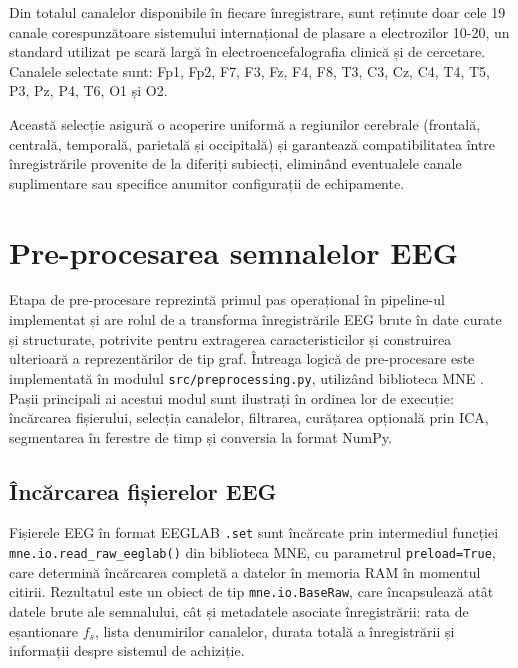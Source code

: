 \documentclass[12pt,a4paper]{report}
\theoremstyle{definition}
\theoremstyle{remark}
\begin{document}
Din totalul canalelor disponibile în fiecare înregistrare, sunt reținute doar cele 19 canale corespunzătoare sistemului internațional de plasare a electrozilor 10-20, un standard utilizat pe scară largă în electroencefalografia clinică și de cercetare. Canalele selectate sunt: Fp1, Fp2, F7, F3, Fz, F4, F8, T3, C3, Cz, C4, T4, T5, P3, Pz, P4, T6, O1 și O2.

Această selecție asigură o acoperire uniformă a regiunilor cerebrale (frontală, centrală, temporală, parietală și occipitală) și garantează compatibilitatea între înregistrările provenite de la diferiți subiecți, eliminând eventualele canale suplimentare sau specifice anumitor configurații de echipamente.

\section{Pre-procesarea semnalelor EEG}
\label{sec:impl_preprocesare}

Etapa de pre-procesare reprezintă primul pas operațional în pipeline-ul implementat și are rolul de a transforma înregistrările EEG brute în date curate și structurate, potrivite pentru extragerea caracteristicilor și construirea ulterioară a reprezentărilor de tip graf. Întreaga logică de pre-procesare este implementată în modulul \texttt{src/preprocessing.py}, utilizând biblioteca MNE \cite{gramfort2013mne}. Pașii principali ai acestui modul sunt ilustrați în ordinea lor de execuție: încărcarea fișierului, selecția canalelor, filtrarea, curățarea opțională prin ICA, segmentarea în ferestre de timp și conversia la format NumPy.

\subsection{Încărcarea fișierelor EEG}

Fișierele EEG în format EEGLAB \texttt{.set} sunt încărcate prin intermediul
funcției \texttt{mne.io.read\_raw\_eeglab()} din biblioteca MNE\@, cu parametrul
\texttt{preload=True}, care determină încărcarea completă a datelor în memoria RAM în momentul citirii. Rezultatul este un obiect de tip \texttt{mne.io.BaseRaw}, care încapsulează atât datele brute ale semnalului, cât și metadatele asociate înregistrării: rata de eșantionare $f_s$, lista denumirilor canalelor, durata totală a înregistrării și informații despre sistemul de achiziție.
\end{document}
